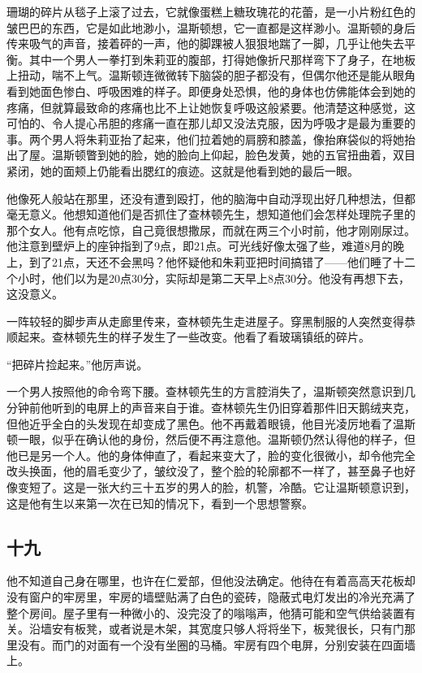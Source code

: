 珊瑚的碎片从毯子上滚了过去，它就像蛋糕上糖玫瑰花的花蕾，是一小片粉红色的皱巴巴的东西，它是如此地渺小，温斯顿想，它一直都是这样渺小。温斯顿的身后传来吸气的声音，接着砰的一声，他的脚踝被人狠狠地踹了一脚，几乎让他失去平衡。其中一个男人一拳打到朱莉亚的腹部，打得她像折尺那样弯下了身子，在地板上扭动，喘不上气。温斯顿连微微转下脑袋的胆子都没有，但偶尔他还是能从眼角看到她面色惨白、呼吸困难的样子。即便身处恐惧，他的身体也仿佛能体会到她的疼痛，但就算最致命的疼痛也比不上让她恢复呼吸这般紧要。他清楚这种感觉，这可怕的、令人提心吊胆的疼痛一直在那儿却又没法克服，因为呼吸才是最为重要的事。两个男人将朱莉亚抬了起来，他们拉着她的肩膀和膝盖，像抬麻袋似的将她抬出了屋。温斯顿瞥到她的脸，她的脸向上仰起，脸色发黄，她的五官扭曲着，双目紧闭，她的面颊上仍能看出腮红的痕迹。这就是他看到她的最后一眼。

他像死人般站在那里，还没有遭到殴打，他的脑海中自动浮现出好几种想法，但都毫无意义。他想知道他们是否抓住了查林顿先生，想知道他们会怎样处理院子里的那个女人。他有点吃惊，自己竟很想撒尿，而就在两三个小时前，他才刚刚尿过。他注意到壁炉上的座钟指到了9点，即21点。可光线好像太强了些，难道8月的晚上，到了21点，天还不会黑吗？他怀疑他和朱莉亚把时间搞错了------他们睡了十二个小时，他们以为是20点30分，实际却是第二天早上8点30分。他没有再想下去，这没意义。

一阵较轻的脚步声从走廊里传来，查林顿先生走进屋子。穿黑制服的人突然变得恭顺起来。查林顿先生的样子发生了一些改变。他看了看玻璃镇纸的碎片。

``把碎片捡起来。''他厉声说。

一个男人按照他的命令弯下腰。查林顿先生的方言腔消失了，温斯顿突然意识到几分钟前他听到的电屏上的声音来自于谁。查林顿先生仍旧穿着那件旧天鹅绒夹克，但他近乎全白的头发现在却变成了黑色。他不再戴着眼镜，他目光凌厉地看了温斯顿一眼，似乎在确认他的身份，然后便不再注意他。温斯顿仍然认得他的样子，但他已是另一个人。他的身体伸直了，看起来变大了，脸的变化很微小，却令他完全改头换面，他的眉毛变少了，皱纹没了，整个脸的轮廓都不一样了，甚至鼻子也好像变短了。这是一张大约三十五岁的男人的脸，机警，冷酷。它让温斯顿意识到，这是他有生以来第一次在已知的情况下，看到一个思想警察。

\subsection{十九}\label{ux5341ux4e5d}

他不知道自己身在哪里，也许在仁爱部，但他没法确定。他待在有着高高天花板却没有窗户的牢房里，牢房的墙壁贴满了白色的瓷砖，隐蔽式电灯发出的冷光充满了整个房间。屋子里有一种微小的、没完没了的嗡嗡声，他猜可能和空气供给装置有关。沿墙安有板凳，或者说是木架，其宽度只够人将将坐下，板凳很长，只有门那里没有。而门的对面有一个没有坐圈的马桶。牢房有四个电屏，分别安装在四面墙上。

